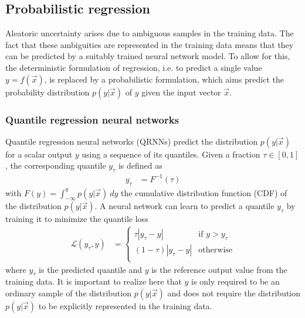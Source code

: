 \subsection{Probabilistic regression}

Aleatoric uncertainty arises due to ambiguous samples in the training data. The
fact that these ambiguities are represented in the training data means that they
can be predicted by a suitably trained neural network model. To allow for this,
the deterministic formulation of regression, i.e. to predict a single value $y =
f(\vec{x})$, is replaced by a probabilistic formulation, which aims predict the
probability distribution $p(y|\vec{x})$ of $y$ given the input vector $\vec{x}$.

\subsubsection{Quantile regression neural networks}


Quantile regression neural networks (QRNNs) predict the distribution
$p(y|\vec{x})$ for a scalar output $y$ using a sequence of its quantiles. Given
a fraction $\tau \in [0, 1]$, the corresponding quantile $y_\tau$ is defined as
\begin{align}
  y_\tau &= F^{-1}(\tau)
\end{align}
with $F(y) = \int_{-\infty}^y p(y|\vec{x})\ dy$ the cumulative distribution
function (CDF) of the distribution $p(y|\vec{x})$. A neural network can learn to predict a quantile
$y_\tau$ by training it to minimize the quantile loss
\begin{align}
  \mathcal{L}(y_\tau, y) &=
  \begin{cases}
    \tau  |y_\tau - y| & \text{if } y > y_\tau \\
    (1 - \tau)  |y_\tau - y| & \text{otherwise} \\
    \end{cases}
\end{align}
where $y_\tau$ is the predicted quantile and $y$ is the reference output value
from the training data. It is important to realize here  that $y$ is only
required to be an ordinary sample of the distribution $p(y|\vec{x})$ and does not
require the distribution $p(y|\vec{x})$ to be explicitly represented in the
training data.

